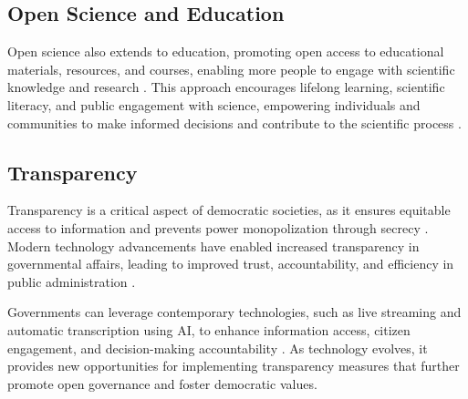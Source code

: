\documentclass{IEEEtran}
\begin{document}
\subsection{Open Science and Education}
Open science also extends to education, promoting open access to educational materials, resources, and courses, enabling more people to engage with scientific knowledge and research \cite{wiley2014open}. This approach encourages lifelong learning, scientific literacy, and public engagement with science, empowering individuals and communities to make informed decisions and contribute to the scientific process \cite{fecher2014openscience}.

\subsection{Transparency}

Transparency is a critical aspect of democratic societies, as it ensures equitable access to information and prevents power monopolization through secrecy \cite{florini2000democratizing}. Modern technology advancements have enabled increased transparency in governmental affairs, leading to improved trust, accountability, and efficiency in public administration \cite{grimmelikhuijsen2012transparency}.

Governments can leverage contemporary technologies, such as live streaming and automatic transcription using AI, to enhance information access, citizen engagement, and decision-making accountability \cite{meijer2009understanding}. As technology evolves, it provides new opportunities for implementing transparency measures that further promote open governance and foster democratic values.

\end{document}
